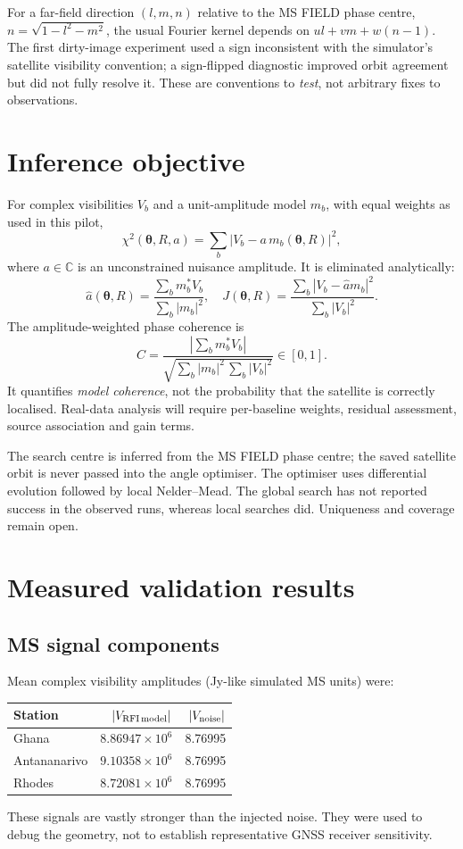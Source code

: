\documentclass[11pt,a4paper]{article}
\begin{document}
For a far-field direction $(l,m,n)$ relative to the MS FIELD phase centre,
$n=\sqrt{1-l^2-m^2}$, the usual Fourier kernel depends on
$ul+vm+w(n-1)$. The first dirty-image experiment used a sign inconsistent
with the simulator's satellite visibility convention; a sign-flipped
diagnostic improved orbit agreement but did not fully resolve it.
These are conventions to \emph{test}, not arbitrary fixes to observations.
\section{Inference objective}
For complex visibilities $V_b$ and a unit-amplitude model $m_b$,
with equal weights as used in this pilot,
\begin{equation}
\chi^2(\boldsymbol\theta,R,a)
=\sum_b |V_b-a\,m_b(\boldsymbol\theta,R)|^2,
\end{equation}
where $a\in\mathbb C$ is an unconstrained nuisance amplitude. It is
eliminated analytically:
\begin{equation}
\hat a(\boldsymbol\theta,R)
=\frac{\sum_b m_b^*V_b}{\sum_b|m_b|^2},\quad
J(\boldsymbol\theta,R)=
\frac{\sum_b|V_b-\hat a m_b|^2}{\sum_b|V_b|^2}.
\label{eq:profile}
\end{equation}
The amplitude-weighted phase coherence is
\begin{equation}
C=\frac{|\sum_b m_b^* V_b|}
{\sqrt{\sum_b|m_b|^2\,\sum_b|V_b|^2}}\in[0,1].
\end{equation}
It quantifies \emph{model coherence}, not the probability that
the satellite is correctly localised. Real-data analysis will require
per-baseline weights, residual assessment, source association and gain terms.

The search centre is inferred from the MS FIELD phase centre;
the saved satellite orbit is never passed into the angle optimiser.
The optimiser uses differential evolution followed by local Nelder--Mead.
The global search has not reported success in the observed runs, whereas
local searches did. Uniqueness and coverage remain open.
\section{Measured validation results}
\subsection{MS signal components}
Mean complex visibility amplitudes (Jy-like simulated MS units) were:
\begin{center}\begin{tabular}{lrr}
\toprule
Station & $|V_{\rm RFI\,model}|$ & $|V_{\rm noise}|$\\\midrule
Ghana & $8.86947\times10^6$ & 8.76995\\
Antananarivo & $9.10358\times10^6$ & 8.76995\\
Rhodes & $8.72081\times10^6$ & 8.76995\\\bottomrule
\end{tabular}\end{center}
These signals are vastly stronger than the injected noise. They were used
to debug the geometry, not to establish representative GNSS receiver sensitivity.
\end{document}

